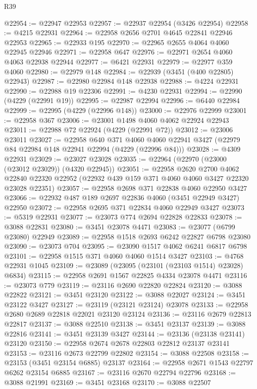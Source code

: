 \begin{lexlean}{R39}
\begin{coremodule}
@22954 := @22947 @22953
@22957 := @22937 @22954 (@3426 @22954)
@22958 := @4215 @22931
@22964 := @22958 @2656 @2701 @4645 @22841 @22946 @22953
@22965 := @22933 @195
@22970 := @22965 @2655 @4064 @4060 @22945 @22946
@22971 := @22958 @647
@22976 := @22971 @2654 @4060 @4063 @22938 @22944
@22977 := @6421 @22931
@22979 := @22977 @359 @4060
@22980 := @22979 @148
@22984 := @22939 (@3451 (@400 @22805) @22943)
@22987 := @22980 @22984 @148 @22938
@22988 := @4224 @22931
@22990 := @22988 @19 @22306
@22991 := @4230 @22931
@22994 := @22990 (@4229 (@22991 @19))
@22995 := @22987 @22994
@22996 := @6440 @22984
@22999 := @22995 (@4229 (@22996 @148))
@23000 := @22976 @22999
@23001 := @22958 @367
@23006 := @23001 @1498 @4060 @4062 @22924 @22943
@23011 := @22988 @72 @22924 (@4229 (@22991 @72))
@23012 := @23006 @23011
@23027 := @22958
    @640
    @371
    @4060
    @4060
    @22941
    @3427
    (@22979 @84 @22984 @148 @22941 @22994 (@4229 (@22996 @84)))
@23028 := @4309 @22931
@23029 := @23027 @23028
@23035 := @22964 (@22970 (@23000 (@23012 @23029)) (@4320 @22945))
@23051 := @22958
    @2620
    @2700
    @4062
    @22840
    @22320
    @22952
    (@22932 @439 @159 @371 @4060 @4060 @3427 @22320 @23028 @22351)
@23057 := @22958 @2698 @371 @22838 @4060 @22950 @3427
@23066 := @22932 @487 @189 @2697 @22836 @4060 (@3451 @22949 @3427) @22950
@23072 := @22958 @2695 @371 @22834 @4060 @22949 @3427
@23073 := @5319 @22931
@23077 := @23073 @774 @2694 @22828 @22833
@23078 := @3088 @22831
@23080 := @3451 @23078 @4471
@23083 := @23077 (@6799 @23080) @22949
@23089 := @22958 @1518 @2693 @6242 @22827 @6798 @23080
@23090 := @23073 @704
@23095 := @23090 @1517 @4062 @6241 @6817 @6798
@23101 := @22958 @1515 @371 @4060 @4060 @1514 @3427
@23103 := @4768 @22931 @1045
@23109 := @23089 (@23095 (@23101 (@23103 @1514) @23028) @6834)
@23115 := @22958 @2691 @1567 @22825 @4334 @23078 @4471
@23116 := @23073 @779
@23119 := @23116 @2690 @22820 @22824
@23120 := @3088 @22822
@23121 := @3451 @23120
@23122 := @3088 @22027
@23124 := @3451 @23122 @3427
@23127 := @23119 (@23121 @23124) @23078
@23133 := @22958 @2680 @2689 @22818 @22021 @23120 @23124
@23136 := @23116 @2679 @22813 @22817
@23137 := @3088 @22510
@23138 := @3451 @23137
@23139 := @3088 @22816
@23141 := @3451 @23139 @3427
@23144 := @23136 (@23138 @23141) @23120
@23150 := @22958 @2674 @2678 @22803 @22812 @23137 @23141
@23153 := @23116 @2673 @22799 @22802
@23154 := @3088 @22508
@23158 := @23153 (@3451 @23154 @6885) @23137
@23164 := @22958 @2671 @1543 @22797 @6262 @23154 @6885
@23167 := @23116 @2670 @22794 @22796
@23168 := @3088 @21991
@23169 := @3451 @23168
@23170 := @3088 @22507

\end{coremodule}
\end{lexlean}
